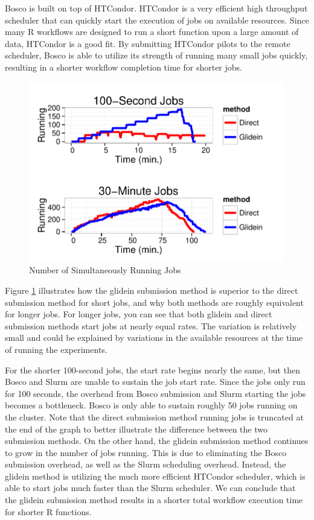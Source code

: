 Bosco is built on top of HTCondor.  HTCondor is a very efficient high throughput scheduler that can quickly start the execution of jobs on available resources.  Since many R workflows are designed to run a short function upon a large amount of data, HTCondor is a good fit.  By submitting HTCondor pilots to the remote scheduler, Bosco is able to utilize its strength of running many small jobs quickly, resulting in a shorter workflow completion time for shorter jobs.

\begin{figure}[h!t]
\centering
\includegraphics[width=\textwidth]{images/NumberRunning-color.pdf}

\caption{Number of Simultaneously Running Jobs}
\label{fig:runningjobs}
\end{figure}

Figure \ref{fig:runningjobs} illustrates how the glidein submission method is superior to the direct submission method for short jobs, and why both methods are roughly equivalent for longer jobs.  For longer jobs, you can see that both glidein and direct submission methods start jobs at nearly equal rates.  The variation is relatively small and could be explained by variations in the available resources at the time of running the experiments. 

For the shorter 100-second jobs, the start rate begins nearly the same, but then Bosco and Slurm are unable to sustain the job start rate.  Since the jobs only run for 100 seconds, the overhead from Bosco submission and Slurm starting the jobs becomes a bottleneck.  Bosco is only able to sustain roughly 50 jobs running on the cluster.  Note that the direct submission method running jobs is truncated at the end of the graph to better illustrate the difference between the two submission methods.   On the other hand, the glidein submission method continues to grow in the number of jobs running.  This is due to eliminating the Bosco submission overhead, as well as the Slurm scheduling overhead.  Instead, the glidein method is utilizing the much more efficient HTCondor scheduler, which is able to start jobs much faster than the Slurm scheduler.  We can conclude that the glidein submission method results in a shorter total workflow execution time for shorter R functions.


